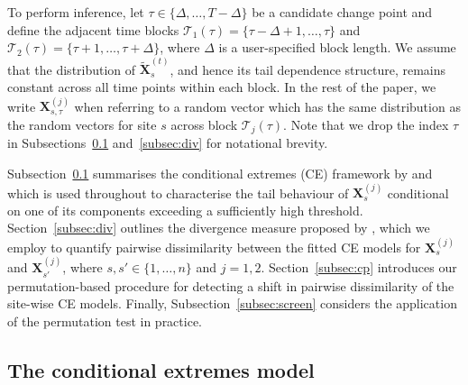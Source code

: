 \documentclass[APA,STIX1COL]{WileyNJD-v2}
\begin{document}
To perform inference, let $\tau\in\{\Delta,\ldots,T-\Delta\}$ be a candidate change point and define the adjacent time blocks $\mathcal{T}_1(\tau)=\{\tau-\Delta+1,\ldots,\tau\}$ and $\mathcal{T}_2(\tau)=\{\tau+1,\ldots,\tau+\Delta\}$, where $\Delta$ is a user-specified block length. 
We assume that the distribution of $\tilde{\boldsymbol{X}}_{s}^{(t)}$, and hence its tail dependence structure, remains constant across all time points within each block.
In the rest of the paper, we write $\boldsymbol{X}_{s,\tau}^{(j)}$ when referring to a random vector which has the same distribution as the random vectors for site $s$ across block $\mathcal{T}_j(\tau)$. Note that we drop the index $\tau$ in Subsections~\ref{subsec:ce} and~\ref{subsec:div} for notational brevity.

Subsection~\ref{subsec:ce} summarises the conditional extremes (CE) framework by \cite{Heffernan2004} and \cite{Keef2013} which is used throughout to characterise the tail behaviour of $\boldsymbol{X}_s^{(j)}$ conditional on one of its components exceeding a sufficiently high threshold. Section~\ref{subsec:div} outlines the divergence measure proposed by \cite{OToole2026clustering}, which we employ to quantify pairwise dissimilarity between the fitted CE models for $\boldsymbol{X}_{s}^{(j)}$ and $\boldsymbol{X}_{s'}^{(j)}$, where $s,s'\in\{1,\ldots,n\}$ and $j=1,2$. Section~\ref{subsec:cp} introduces our permutation-based procedure for detecting a shift in pairwise dissimilarity of the site-wise CE models. Finally, Subsection~\ref{subsec:screen} considers the application of the permutation test in practice.

\subsection{The conditional extremes model}
\label{subsec:ce}
\end{document}
